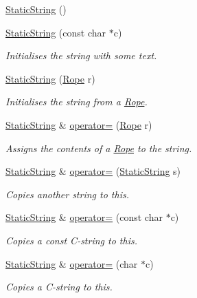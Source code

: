 \begin{DoxyCompactItemize}
\item 
\hyperlink{classetk_1_1_static_string_a1f83e4dfbd9d0d890b55bd6a8d847c71}{Static\-String} ()
\item 
\hyperlink{classetk_1_1_static_string_a981a44c389ceafb80a62fe4fe395e126}{Static\-String} (const char $\ast$c)
\begin{DoxyCompactList}\small\item\em Initialises the string with some text. \end{DoxyCompactList}\item 
\hyperlink{classetk_1_1_static_string_a0e35289bf9413c495bc99d369b37840a}{Static\-String} (\hyperlink{classetk_1_1_rope}{Rope} r)
\begin{DoxyCompactList}\small\item\em Initialises the string from a \hyperlink{classetk_1_1_rope}{Rope}. \end{DoxyCompactList}\item 
\hyperlink{classetk_1_1_static_string}{Static\-String} \& \hyperlink{classetk_1_1_static_string_ab77524b899b77838dc7b88fe31506bf9}{operator=} (\hyperlink{classetk_1_1_rope}{Rope} r)
\begin{DoxyCompactList}\small\item\em Assigns the contents of a \hyperlink{classetk_1_1_rope}{Rope} to the string. \end{DoxyCompactList}\item 
\hyperlink{classetk_1_1_static_string}{Static\-String} \& \hyperlink{classetk_1_1_static_string_a8722a4de7f47236f259a4563cfddc7f8}{operator=} (\hyperlink{classetk_1_1_static_string}{Static\-String} s)
\begin{DoxyCompactList}\small\item\em Copies another string to this. \end{DoxyCompactList}\item 
\hyperlink{classetk_1_1_static_string}{Static\-String} \& \hyperlink{classetk_1_1_static_string_ae01ca97fe3e5c6ed095668266c62dea3}{operator=} (const char $\ast$c)
\begin{DoxyCompactList}\small\item\em Copies a const C-\/string to this. \end{DoxyCompactList}\item 
\hyperlink{classetk_1_1_static_string}{Static\-String} \& \hyperlink{classetk_1_1_static_string_a9d867b3fa673e549c7ec3e316432858e}{operator=} (char $\ast$c)
\begin{DoxyCompactList}\small\item\em Copies a C-\/string to this. \end{DoxyCompactList}\item 

\end{DoxyCompactItemize}
